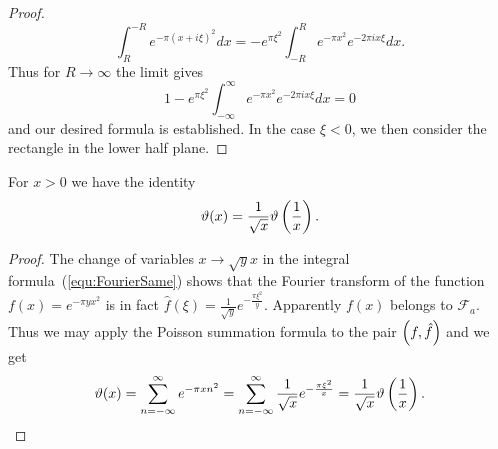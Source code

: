 \begin{proof}
\begin{equation*}
	\int _{R} ^{-R} e^{-\pi (x + i \xi)^2} dx = -e^{\pi \xi^2} \int _{-R} ^R e^{-\pi x^2} e^{-2 \pi i x \xi} dx.
\end{equation*}
	Thus for $R \to \infty$ the limit gives
\begin{equation*}
	1 - e^{\pi \xi^2} \int _{-\infty} ^{\infty} e^{-\pi x^2} e^{-2 \pi i x \xi} dx = 0
\end{equation*}
	and our desired formula is established. In the case $\xi < 0$, we then consider the rectangle in the lower half plane.
\end{proof}


\begin{lemma}
	For $x > 0$ we have the identity
\begin{equation*}
	\vartheta(x) = \frac{1}{\sqrt{x}} \vartheta\left(\frac{1}{x}\right).
\end{equation*}
\end{lemma}
\begin{proof}
	The change of variables $x \to \sqrt{y} x$ in the integral formula~(\ref{equ:FourierSame}) shows that the Fourier transform of the function $f(x) = e^{-\pi y x^2}$ is in fact $\hat{f}(\xi) = \frac{1}{\sqrt{y}} e^{-\frac{\pi \xi^2}{y}}$. Apparently $f(x)$ belongs to $\mathcal{F}_a$. Thus we may apply the Poisson summation formula to the pair $\left(f, \hat{f}\right)$ and we get
\begin{equation*}
	\vartheta(x) = \sum _{n = -\infty} ^\infty e^{-\pi x n^2} = \sum _{n = -\infty} ^\infty \frac{1}{\sqrt{x}} e^{-\frac{\pi \xi^2}{x}} = \frac{1}{\sqrt{x}} \vartheta\left(\frac{1}{x}\right).
\end{equation*}
\end{proof}


